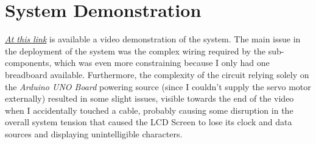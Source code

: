 \documentclass[a4paper,12pt]{report}
\begin{document}
	\chapter{System Demonstration}
	\href{https://drive.google.com/file/d/1sJzZS7W2lpVfR6PkC-G01fWDvBJBSuEa/view?usp=drive_link}{\textit{At this link}} is available a video demonstration of the system.
	\newline The main issue in the deployment of the system was the complex wiring required by the sub-components, which was even more constraining because I only had one breadboard available. Furthermore, the complexity of the circuit relying solely on the \textit{Arduino UNO Board} powering source (since I couldn't supply the servo motor externally) resulted in some slight issues, visible towards the end of the video when I accidentally touched a cable, probably causing some disruption in the overall system tension that caused the LCD Screen to lose its clock and data sources and displaying unintelligible characters.
	
\end{document}
